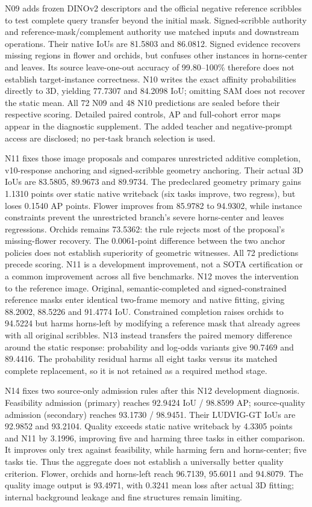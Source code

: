 N09 adds frozen DINOv2 descriptors and the official negative reference scribbles
to test complete query transfer beyond the initial mask. Signed-scribble authority
and reference-mask/complement authority use matched inputs and downstream
operations. Their native IoUs are 81.5803 and 86.0812. Signed evidence recovers
missing regions in flower and orchids, but confuses other instances in
horns-center and leaves. Its source leave-one-out accuracy of 99.80--100\%
therefore does not establish target-instance correctness. N10 writes the exact
affinity probabilities directly to 3D, yielding 77.7307 and 84.2098 IoU;
omitting SAM does not recover the static mean. All 72 N09 and 48 N10 predictions
are sealed before their respective scoring. Detailed paired controls, AP and
full-cohort error maps appear in the diagnostic supplement. The added teacher
and negative-prompt access are disclosed; no per-task branch selection is used.

N11 fixes those image proposals and compares unrestricted additive completion,
v10-response anchoring and signed-scribble geometry anchoring. Their actual 3D
IoUs are 83.5805, 89.9673 and 89.9734. The predeclared geometry primary gains
1.1310 points over static native writeback (six tasks improve, two regress),
but loses 0.1540 AP points. Flower improves from 85.9782 to 94.9302, while
instance constraints prevent the unrestricted branch's severe horns-center
and leaves regressions. Orchids remains 73.5362: the rule rejects most of the
proposal's missing-flower recovery. The 0.0061-point difference between the
two anchor policies does not establish superiority of geometric witnesses.
All 72 predictions precede scoring. N11 is a development improvement, not a
SOTA certification or a common improvement across all five benchmarks.
N12 moves the intervention to the reference image. Original, semantic-completed
and signed-constrained reference masks enter identical two-frame memory and
native fitting, giving 88.2002, 88.5226 and 91.4774 IoU. Constrained completion
raises orchids to 94.5224 but harms horns-left by modifying a reference mask
that already agrees with all original scribbles. N13 instead transfers the
paired memory difference around the static response: probability and log-odds
variants give 90.7469 and 89.4416. The probability residual harms all eight tasks
versus its matched complete replacement, so it is not retained as a required
method stage.

N14 fixes two source-only admission rules after this N12 development diagnosis.
Feasibility admission (primary) reaches 92.9424 IoU / 98.8599 AP; source-quality
admission (secondary) reaches 93.1730 / 98.9451. Their LUDVIG-GT IoUs are 92.9852
and 93.2104. Quality exceeds static native writeback by 4.3305 points and N11
by 3.1996, improving five and harming three tasks in either comparison. It
improves only trex against feasibility, while harming fern and horns-center;
five tasks tie. Thus the aggregate does not establish a universally better
quality criterion. Flower, orchids and horns-left reach 96.7139, 95.6011 and
94.8079. The quality image output is 93.4971, with 0.3241 mean loss after actual
3D fitting; internal background leakage and fine structures remain limiting.

